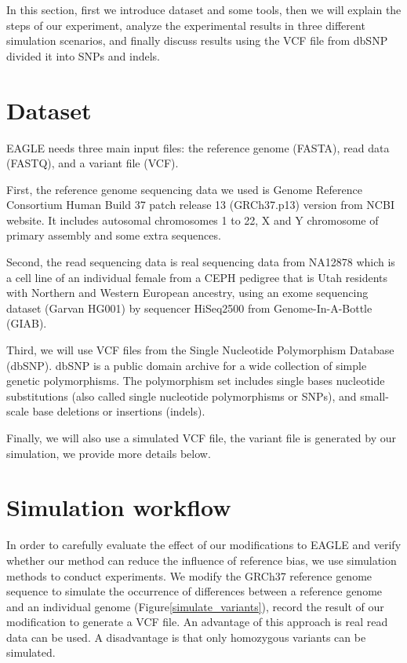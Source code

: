 \hspace{24pt}
In this section, first we introduce dataset and some tools, then we will explain the steps of our experiment, analyze the experimental results in three different simulation scenarios, and finally discuss results using the VCF file from dbSNP divided it into SNPs and indels.

\section{Dataset}
EAGLE needs three main input files: the reference genome (FASTA), read data (FASTQ), and a variant file (VCF). 

First, the reference genome sequencing data we used is Genome Reference Consortium Human Build 37 patch release 13 (GRCh37.p13) version from NCBI website.  It includes autosomal chromosomes 1 to 22, X and Y chromosome of primary assembly and some extra sequences.

Second, the read sequencing data is real sequencing data from NA12878 which is a cell line of an individual female from a CEPH pedigree that is Utah residents with Northern and Western European ancestry, using an exome sequencing dataset (Garvan HG001) by sequencer HiSeq2500 from Genome-In-A-Bottle (GIAB).

Third, we will use VCF files from the Single Nucleotide Polymorphism Database (dbSNP). dbSNP is a public domain archive for a wide collection of simple genetic polymorphisms. The polymorphism set includes single bases nucleotide substitutions (also called single nucleotide polymorphisms or SNPs), and small-scale base deletions or insertions (indels).

Finally, we will also use a simulated VCF file, the variant file is generated by our simulation, we provide more details below.

\section{Simulation workflow}
In order to carefully evaluate the effect of our modifications to EAGLE and verify whether our method can reduce the influence of reference bias, we use simulation methods to conduct experiments. We modify the GRCh37 reference genome sequence to simulate the occurrence of differences between a reference genome and an individual genome (Figure\ref{simulate_variants}), record the result of our modification to generate a VCF file.  An advantage of this approach is real read data can be used.  A disadvantage is that only homozygous variants can be simulated.

